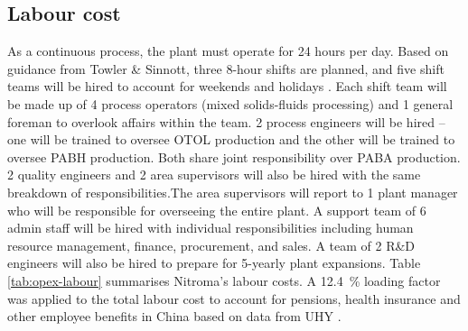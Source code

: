 \subsection{Labour cost}
As a continuous process, the plant must operate for 24 hours per day. Based on guidance from Towler \& Sinnott, three 8-hour shifts are planned, and five shift teams will be hired to account for weekends and holidays \cite{sinnott_chemical_2020}. Each shift team will be made up of 4 process operators (mixed solids-fluids processing) and 1 general foreman to overlook affairs within the team. 2 process engineers will be hired – one will be trained to oversee OTOL production and the other will be trained to oversee PABH production. Both share joint responsibility over PABA production. 2 quality engineers and 2 area supervisors will also be hired with the same breakdown of responsibilities.The area supervisors will report to 1 plant manager who will be responsible for overseeing the entire plant. A support team of 6 admin staff will be hired with individual responsibilities including human resource management, finance, procurement, and sales. A team of 2 R\&D engineers will also be hired to prepare for 5-yearly plant expansions.
Table \ref{tab:opex-labour} summarises Nitroma's labour costs. A \SI{12.4}{\percent} loading factor was applied to the total labour cost to account for pensions, health insurance and other employee benefits in China based on data from UHY \cite{uhy_employers_2021}.

